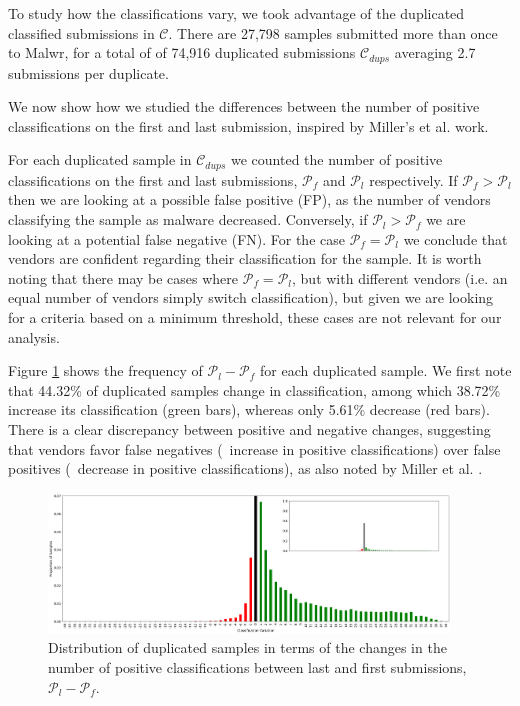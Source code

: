 To study how the classifications vary, we took advantage of the duplicated classified submissions in $\mathcal{C}$. There are 27,798 samples submitted more than once to Malwr, for a total of of 74,916
duplicated submissions $\mathcal{C}_{dups}$ averaging 2.7 submissions per
duplicate.

We now show how we studied the differences between the number of positive classifications on the first and last submission, inspired by Miller's et al. \cite{miller:rev_int} work.

For each duplicated sample in $\mathcal{C}_{dups}$ we counted the number
of positive classifications on the first and last submissions, $\mathcal{P}_f$ and $\mathcal{P}_l$ respectively.
If $\mathcal{P}_f > \mathcal{P}_l$ then we are looking
at a possible false positive (FP), as the number of vendors
classifying the sample as malware decreased.
Conversely, if
$\mathcal{P}_l > \mathcal{P}_f$ we are looking at a potential false negative (FN).
For the case $\mathcal{P}_f = \mathcal{P}_l$ we conclude that vendors are confident regarding their classification for the sample. It is worth noting that there may be cases where $\mathcal{P}_f = \mathcal{P}_l$, but with different vendors (i.e. an equal number of vendors simply switch classification), but given we are looking for a criteria based on a minimum threshold, these cases are not relevant for our analysis.

Figure \ref{fig:dups_frequency} shows the frequency of $\mathcal{P}_l-\mathcal{P}_f$ for each duplicated
sample.
We first note that 44.32\% of duplicated samples change in classification, among which 38.72\% increase its classification (green bars), whereas only 5.61\% decrease (red bars).
There is a clear discrepancy between positive and negative changes, suggesting that vendors favor false negatives (\ie\ increase in positive classifications) over false positives (\ie\ decrease in positive classifications), as also noted by Miller et al. \cite{miller:rev_int}.

\begin{figure}[!htb]
	\centering
	\includegraphics[width=0.95\textwidth]{Figures/dups_frequency.png}
	\caption[Distribution of duplicated samples.]{Distribution of duplicated samples in terms of the changes in the number of
positive classifications between last and first submissions, $\mathcal{P}_l-\mathcal{P}_f$.}
	\label{fig:dups_frequency}
\end{figure}

